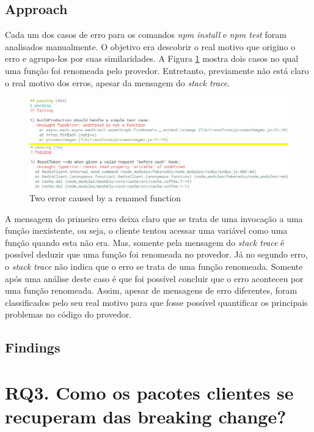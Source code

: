 \subsection{Approach}
\label{apr:rq2}

Cada um dos casos de erro para os comandos \textit{npm install} e \textit{npm test} foram analisados manualmente. O objetivo era descobrir o real motivo que origino o erro e agrupa-los por suas similaridades. A Figura \ref{fig:error_category} mostra dois casos no qual uma função foi renomeada pelo provedor. Entretanto, previamente não está claro o real motivo dos erros, apesar da mensagem do \textit{stack trace}.

\begin{figure}[!h]
    \centering
    \includegraphics[scale=0.5]{figuras/error_category.jpeg}
    \caption{Two error caused by a renamed function}
    \label{fig:error_category}
\end{figure}

A mensagem do primeiro erro deixa claro que se trata de uma invocação a uma função inexistente, ou seja, o cliente tentou acessar uma variável como uma função quando esta não era. Mas, somente pela mensagem do \textit{stack trace} é possível deduzir que uma função foi renomeada no provedor. Já no segundo erro, o \textit{stack trace} não indica que o erro se trata de uma função renomeada. Somente após uma análise deste caso é que foi possível concluir que o erro aconteceu por uma função renomeada. Assim, apesar de mensagens de erro diferentes, foram classificados pelo seu real motivo para que fosse possível quantificar os principais problemas no código do provedor.

\subsection{Findings}
\label{fin:rq2}

\section{RQ3. Como os pacotes clientes se recuperam das breaking change?}
\label{sec:rq3}

